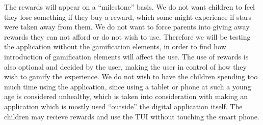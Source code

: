 The rewards will appear on a ``milestone'' basis. We do not want children to feel they lose something if they buy a reward, which some might experience if stars were taken away from them. We do not want to force parents into giving away rewards they can not afford or do not wish to use. Therefore we will be testing the application without the gamification elements, in order to find how introduction of gamification elements will affect the use. The use of rewards is also optional and decided by the user, making the user in control of how they wish to gamify the experience. 
We do not wish to have the children spending too much time using the application, since using a tablet or phone at such a young age is considered unhealthy, which is taken into consideration with making an application which is mostly used ``outside'' the digital application itself. The children may recieve rewards and use the TUI without touching the smart phone.

